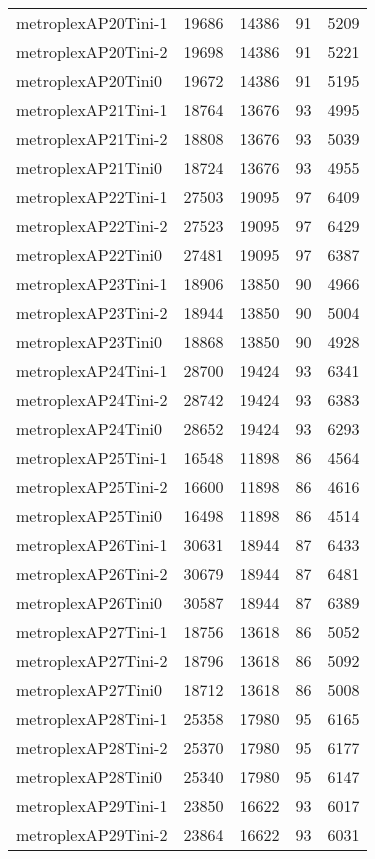 \begin{tabular}{lrrrr}
metroplexAP20Tini-1 & 19686 & 14386 & 91 & 5209 \\
metroplexAP20Tini-2 & 19698 & 14386 & 91 & 5221 \\
metroplexAP20Tini0 & 19672 & 14386 & 91 & 5195 \\
metroplexAP21Tini-1 & 18764 & 13676 & 93 & 4995 \\
metroplexAP21Tini-2 & 18808 & 13676 & 93 & 5039 \\
metroplexAP21Tini0 & 18724 & 13676 & 93 & 4955 \\
metroplexAP22Tini-1 & 27503 & 19095 & 97 & 6409 \\
metroplexAP22Tini-2 & 27523 & 19095 & 97 & 6429 \\
metroplexAP22Tini0 & 27481 & 19095 & 97 & 6387 \\
metroplexAP23Tini-1 & 18906 & 13850 & 90 & 4966 \\
metroplexAP23Tini-2 & 18944 & 13850 & 90 & 5004 \\
metroplexAP23Tini0 & 18868 & 13850 & 90 & 4928 \\
metroplexAP24Tini-1 & 28700 & 19424 & 93 & 6341 \\
metroplexAP24Tini-2 & 28742 & 19424 & 93 & 6383 \\
metroplexAP24Tini0 & 28652 & 19424 & 93 & 6293 \\
metroplexAP25Tini-1 & 16548 & 11898 & 86 & 4564 \\
metroplexAP25Tini-2 & 16600 & 11898 & 86 & 4616 \\
metroplexAP25Tini0 & 16498 & 11898 & 86 & 4514 \\
metroplexAP26Tini-1 & 30631 & 18944 & 87 & 6433 \\
metroplexAP26Tini-2 & 30679 & 18944 & 87 & 6481 \\
metroplexAP26Tini0 & 30587 & 18944 & 87 & 6389 \\
metroplexAP27Tini-1 & 18756 & 13618 & 86 & 5052 \\
metroplexAP27Tini-2 & 18796 & 13618 & 86 & 5092 \\
metroplexAP27Tini0 & 18712 & 13618 & 86 & 5008 \\
metroplexAP28Tini-1 & 25358 & 17980 & 95 & 6165 \\
metroplexAP28Tini-2 & 25370 & 17980 & 95 & 6177 \\
metroplexAP28Tini0 & 25340 & 17980 & 95 & 6147 \\
metroplexAP29Tini-1 & 23850 & 16622 & 93 & 6017 \\
metroplexAP29Tini-2 & 23864 & 16622 & 93 & 6031 \\

\end{tabular}
